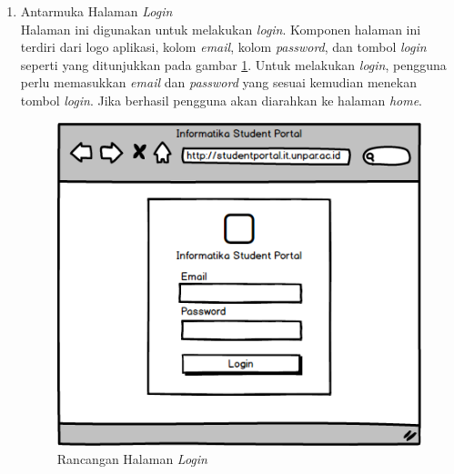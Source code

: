 \begin{enumerate}
	\item {Antarmuka Halaman \textit{Login}}\\
	Halaman ini digunakan untuk melakukan \textit{login}. Komponen halaman ini terdiri dari logo aplikasi, kolom \textit{email}, kolom \textit{password}, dan tombol \textit{login} seperti yang ditunjukkan pada gambar \ref{fig:4_ranc_login}. Untuk melakukan \textit{login}, pengguna perlu memasukkan \textit{email} dan \textit{password} yang sesuai kemudian menekan tombol \textit{login}. Jika berhasil pengguna akan diarahkan ke halaman \textit{home}. 
		\begin{figure}[H]
			\centering
			\includegraphics[scale=0.5]{Gambar/Login_Page}
			\caption{Rancangan Halaman \textit{Login}} 
			\label{fig:4_ranc_login}
		\end{figure}
		

\end{enumerate}
